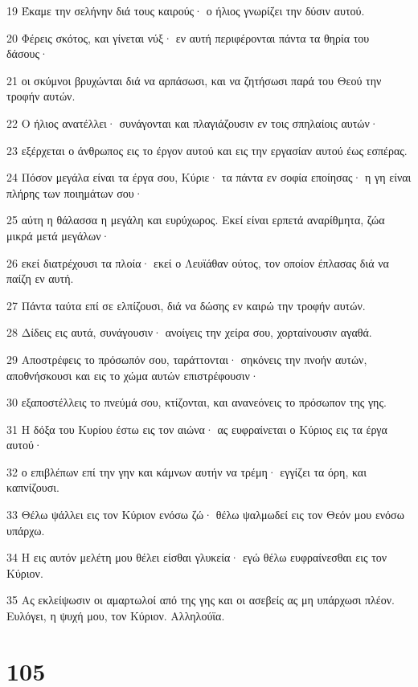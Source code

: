 \par 19 Έκαμε την σελήνην διά τους καιρούς· ο ήλιος γνωρίζει την δύσιν αυτού.
\par 20 Φέρεις σκότος, και γίνεται νύξ· εν αυτή περιφέρονται πάντα τα θηρία του δάσους·
\par 21 οι σκύμνοι βρυχώνται διά να αρπάσωσι, και να ζητήσωσι παρά του Θεού την τροφήν αυτών.
\par 22 Ο ήλιος ανατέλλει· συνάγονται και πλαγιάζουσιν εν τοις σπηλαίοις αυτών·
\par 23 εξέρχεται ο άνθρωπος εις το έργον αυτού και εις την εργασίαν αυτού έως εσπέρας.
\par 24 Πόσον μεγάλα είναι τα έργα σου, Κύριε· τα πάντα εν σοφία εποίησας· η γη είναι πλήρης των ποιημάτων σου·
\par 25 αύτη η θάλασσα η μεγάλη και ευρύχωρος. Εκεί είναι ερπετά αναρίθμητα, ζώα μικρά μετά μεγάλων·
\par 26 εκεί διατρέχουσι τα πλοία· εκεί ο Λευϊάθαν ούτος, τον οποίον έπλασας διά να παίζη εν αυτή.
\par 27 Πάντα ταύτα επί σε ελπίζουσι, διά να δώσης εν καιρώ την τροφήν αυτών.
\par 28 Δίδεις εις αυτά, συνάγουσιν· ανοίγεις την χείρα σου, χορταίνουσιν αγαθά.
\par 29 Αποστρέφεις το πρόσωπόν σου, ταράττονται· σηκόνεις την πνοήν αυτών, αποθνήσκουσι και εις το χώμα αυτών επιστρέφουσιν·
\par 30 εξαποστέλλεις το πνεύμά σου, κτίζονται, και ανανεόνεις το πρόσωπον της γης.
\par 31 Η δόξα του Κυρίου έστω εις τον αιώνα· ας ευφραίνεται ο Κύριος εις τα έργα αυτού·
\par 32 ο επιβλέπων επί την γην και κάμνων αυτήν να τρέμη· εγγίζει τα όρη, και καπνίζουσι.
\par 33 Θέλω ψάλλει εις τον Κύριον ενόσω ζώ· θέλω ψαλμωδεί εις τον Θεόν μου ενόσω υπάρχω.
\par 34 Η εις αυτόν μελέτη μου θέλει είσθαι γλυκεία· εγώ θέλω ευφραίνεσθαι εις τον Κύριον.
\par 35 Ας εκλείψωσιν οι αμαρτωλοί από της γης και οι ασεβείς ας μη υπάρχωσι πλέον. Ευλόγει, η ψυχή μου, τον Κύριον. Αλληλούϊα.

\chapter{105}

